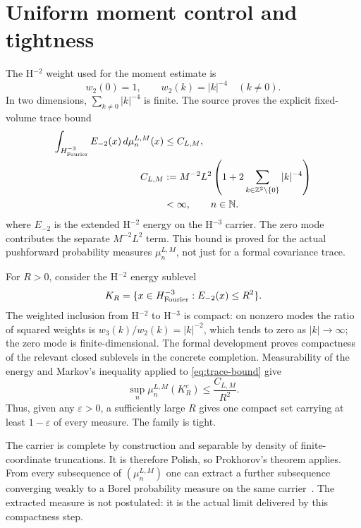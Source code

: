 \section{Uniform moment control and tightness}
\label{sec:tightness}

The H$^{-2}$ weight used for the moment estimate is
\[
 w_2(0)=1,\qquad w_2(k)=|k|^{-4}\quad(k\ne0).
\]
In two dimensions, $\sum_{k\ne0}|k|^{-4}$ is finite. The source proves the explicit fixed-volume trace bound
\begin{align}
 \int_{H^{-3}_{\mathrm{Fourier}}} E_{-2}(x)\,d\mu_n^{L,M}(x)&\le C_{L,M},
 \label{eq:trace-bound}\\
 C_{L,M}&:=M^{-2}L^2\left(1+2\sum_{k\in\mathbb{Z}^2\setminus\{0\}}|k|^{-4}\right)\\
       &<\infty,\qquad n\in\mathbb{N}.
\end{align}
where $E_{-2}$ is the extended H$^{-2}$ energy on the H$^{-3}$ carrier. The zero mode contributes the separate $M^{-2}L^2$ term. This bound is proved for the actual pushforward probability measures $\mu_n^{L,M}$, not just for a formal covariance trace.

For $R>0$, consider the H$^{-2}$ energy sublevel
\[
  K_R=\{x\in H^{-3}_{\mathrm{Fourier}}:E_{-2}(x)\le R^2\}.
\]
The weighted inclusion from H$^{-2}$ to H$^{-3}$ is compact: on nonzero modes the ratio of squared weights is $w_3(k)/w_2(k)=|k|^{-2}$, which tends to zero as $|k|\to\infty$; the zero mode is finite-dimensional. The formal development proves compactness of the relevant closed sublevels in the concrete completion. Measurability of the energy and Markov's inequality applied to \eqref{eq:trace-bound} give
\[
  \sup_n\mu_n^{L,M}(K_R^c)\le \frac{C_{L,M}}{R^2}.
\]
Thus, given any $\varepsilon>0$, a sufficiently large $R$ gives one compact set carrying at least $1-\varepsilon$ of every measure. The family is tight.

The carrier is complete by construction and separable by density of finite-coordinate truncations. It is therefore Polish, so Prokhorov's theorem applies. From every subsequence of $(\mu_n^{L,M})$ one can extract a further subsequence converging weakly to a Borel probability measure on the same carrier~\cite{billingsley}. The extracted measure is not postulated: it is the actual limit delivered by this compactness step.

